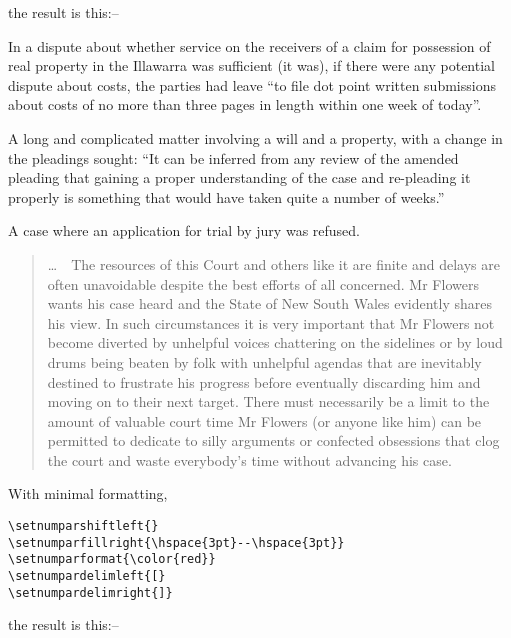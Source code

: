 \noindent the result is this:--
\bigskip


\setnumparshiftleft{\hspace{-2.5em}}
\setnumparfillright{\hspace{3.5em}}
\setnumparformat{\color{blue}\bfseries}
\setnumpardelimleft{}
\p In a dispute about whether service on the receivers of a claim for possession of real property in the Illawarra was sufficient (it was), if there were any potential dispute about costs, the parties had leave ``to file dot point written submissions about costs of no more than three pages in length within one week of today''.

\p A long and complicated matter involving a will and a property, with a change in the pleadings sought: ``It can be inferred from any review of the amended pleading that gaining a proper understanding of the case and re-pleading it properly is something that would have taken quite a number of weeks.''

\p A case where an application for trial by jury was refused.
\begin{quotation}
\ldots\ \  The resources of this Court and others like it are finite and delays are often unavoidable despite the best efforts of all concerned. Mr Flowers wants his case heard and the State of New South Wales evidently shares his view. In such circumstances it is very important that Mr Flowers not become diverted by unhelpful voices chattering on the sidelines or by loud drums being beaten by folk with unhelpful agendas that are inevitably destined to frustrate his progress before eventually discarding him and moving on to their next target. There must necessarily be a limit to the amount of valuable court time Mr Flowers (or anyone like him) can be permitted to dedicate to silly arguments or confected obsessions that clog the court and waste everybody’s time without advancing his case.
\end{quotation}
\bigskip

With minimal formatting,
\begin{verbatim}
\setnumparshiftleft{}
\setnumparfillright{\hspace{3pt}--\hspace{3pt}}
\setnumparformat{\color{red}}
\setnumpardelimleft{[}
\setnumpardelimright{]}
\end{verbatim}
\bigskip

\noindent the result is this:--
\bigskip


